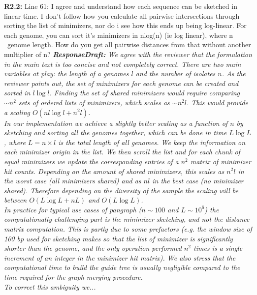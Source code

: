 \documentclass[aps,rmp,onecolumn]{revtex4-1}
\newcommand{\Marco}[1]{{\color{gray}Marco: #1}}
\newcommand{\Liam}[1]{{\color{teal}Liam: #1}}
\newcommand{\reviewer}[2]{\textbf{#1:} #2\vskip 5mm}
\newcommand{\responsedraft}[1]{{\it {\color{purple}\textbf{ResponseDraft:} #1}}\vskip 5mm}
\begin{document}
\reviewer{R2.2}{Line 61: I agree and understand how each sequence can be sketched in linear time. I don't follow how you calculate all pairwise intersections through sorting the list of minimizers, nor do i see how this ends up being log-linear. For each genome, you can sort it's minimizers in nlog(n) (ie log linear), where n ~genome length. How do you get all pairwise distances from that without another multiplier of n?}
\responsedraft{We agree with the reviewer that the formulation in the main text is too concise and not completely correct. There are two main variables at play: the length of a genomes $l$ and the number of isolates $n$. As the reviewer points out, the set of minimizers for each genome can be created and sorted in $l \log l$. Finding the set of shared minimizers would require comparing $\sim n^2$ sets of ordered lists of minimizers, which scales as $\sim n^2 l$. This would provide a scaling $O(n l \log l + n^2 l)$.\\
      In our implementation we achieve a slightly better scaling as a function of $n$ by sketching and sorting all the genomes together, which can be done in time $L \log L$, where $L= n \times l$ is the total length of all genomes. We keep the information on each minimizer origin in the list. We then scroll the list and for each chunk of equal minimizers we update the corresponding entries of a $n^2$ matrix of minimizer hit counts. Depending on the amount of shared minimizers, this scales as $n^2 l$ in the worst case (all minimizers shared) and as $n l$ in the best case (no minimizer shared). Therefore depending on the diversity of the sample the scaling will be between $O(L \log L + n L)$ and $O(L \log L)$.\\
      In practice for typical use cases of pangraph ($n \sim 100$ and $L \sim 10^6$) the computationally challenging part is the minimizer sketching, and not the distance matrix computation. This is partly due to some prefactors (e.g. the window size of 100 bp used for sketching makes so that the list of minimizer is significantly shorter than the genome, and the only operation performed $n^2$ times is a single increment of an integer in the minimizer hit matrix). We also stress that the computational time to build the guide tree is usually negligible compared to the time required for the graph merging procedure.\\
      To correct this ambiguity we...
}
\end{document}
